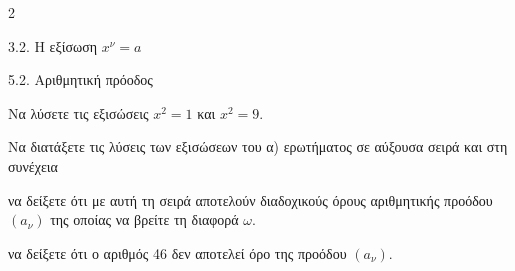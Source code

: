 \begin{ylh}{2}
    \item 3.2. Η εξίσωση $x^{\nu}=a$
    \item 5.2. Αριθμητική πρόοδος
\end{ylh}

\begin{alist}
\item Να λύσετε τις εξισώσεις $x^2 = 1$ και $x^2 = 9$.
\item Να διατάξετε τις λύσεις των εξισώσεων του α) ερωτήματος σε αύξουσα σειρά και στη συνέχεια

\begin{rlist}
\item να δείξετε ότι με αυτή τη σειρά αποτελούν διαδοχικούς όρους αριθμητικής προόδου $(a_\nu)$ της οποίας να βρείτε τη διαφορά $\omega$.

\item να δείξετε ότι ο αριθμός 46 δεν αποτελεί όρο της προόδου $(a_\nu)$.
\end{rlist}
\end{alist}

